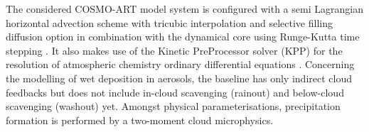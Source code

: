 The  considered  COSMO-ART model  system  is  configured  with a  semi
Lagrangian horizontal advection scheme with tricubic interpolation and
selective filling  diffusion option in combination  with the dynamical
core  using Runge-Kutta  time  stepping \citep{COSMO-PartI-2011}.   It
also  makes use  of  the  Kinetic PreProcessor  solver  (KPP) for  the
resolution  of atmospheric  chemistry ordinary  differential equations
\citep{Damian-2002}.   Concerning the modelling  of wet  deposition in
aerosols, the  baseline has only indirect cloud  feedbacks but does not
include  in-cloud  scavenging  (rainout)  and  below-cloud  scavenging
(washout)  yet.   Amongst  physical  parameterisations,  precipitation
formation is performed by a two-moment cloud microphysics.
